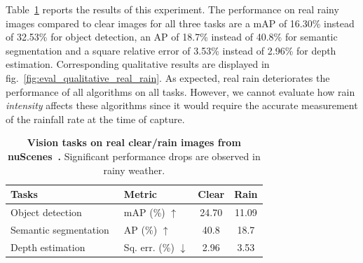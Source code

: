 Table~\ref{fig:real_rain_perf} reports the results of this experiment. The performance on real rainy images compared to clear images for all three tasks are a mAP of 16.30\% instead of 32.53\% for object detection, an AP of 18.7\% instead of 40.8\% for semantic segmentation and a square relative error of 3.53\% instead of 2.96\% for depth estimation. Corresponding qualitative results are displayed in fig.~\ref{fig:eval_qualitative_real_rain}. 
As expected, real rain deteriorates the performance of all algorithms on all tasks. However, we cannot evaluate how rain \emph{intensity} affects these algorithms since it would require the accurate measurement of the rainfall rate at the time of capture.


\begin{table}
 \centering
  \scriptsize
  \setlength{\tabcolsep}{0.18cm}
  \renewcommand{\arraystretch}{1.0}
  \begin{tabular}{llcc}
   \toprule
   Tasks & Metric & Clear & Rain \\
   \midrule
   Object detection~\cite{redmon2017yolo9000} & mAP (\%) $\uparrow$ & 24.70 & 11.09 \\
   Semantic segmentation~\cite{zhao2017pspnet} & AP (\%) $\uparrow$ & 40.8 & 18.7 \\
   Depth estimation~\cite{godard2019digging} & Sq. err. (\%) $\downarrow$ & 2.96 & 3.53 \\ 
   \bottomrule
 \end{tabular}\hspace{.025\linewidth}
 \caption{\textbf{Vision tasks on real clear/rain images from nuScenes~\cite{caesar2019nuscenes}.} Significant performance drops are observed in rainy weather.}
 \label{fig:real_rain_perf}
\end{table} 
